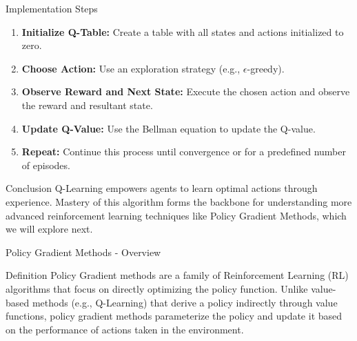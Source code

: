 \documentclass[aspectratio=169]{beamer}
\begin{document}
\begin{frame}[fragile]{Implementation Steps}
    \begin{enumerate}
        \item \textbf{Initialize Q-Table:} Create a table with all states and actions initialized to zero.
        \item \textbf{Choose Action:} Use an exploration strategy (e.g., $\epsilon$-greedy).
        \item \textbf{Observe Reward and Next State:} Execute the chosen action and observe the reward and resultant state.
        \item \textbf{Update Q-Value:} Use the Bellman equation to update the Q-value.
        \item \textbf{Repeat:} Continue this process until convergence or for a predefined number of episodes.
    \end{enumerate}
\end{frame}

\begin{frame}{Conclusion}
    Q-Learning empowers agents to learn optimal actions through experience. Mastery of this algorithm forms the backbone for understanding more advanced reinforcement learning techniques like Policy Gradient Methods, which we will explore next.
\end{frame}

\begin{frame}[fragile]{Policy Gradient Methods - Overview}
    \begin{block}{Definition}
        Policy Gradient methods are a family of Reinforcement Learning (RL) algorithms that focus on directly optimizing the policy function. Unlike value-based methods (e.g., Q-Learning) that derive a policy indirectly through value functions, policy gradient methods parameterize the policy and update it based on the performance of actions taken in the environment.
    \end{block}
\end{frame}
\end{document}
